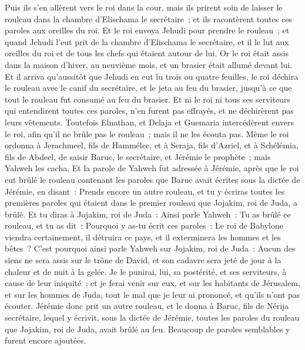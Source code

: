 \begin{multicols}{2}
Puis ils s'en allèrent vers le roi dans la cour, mais ils prirent soin de laisser le rouleau dans la chambre d'Elischama le secrétaire~; et ils racontèrent toutes ces paroles aux oreilles du roi.
Et le roi envoya Jehudi pour prendre le rouleau~; et quand Jehudi l'eut prit de la chambre d'Elischama le secrétaire, et il le lut aux oreilles du roi et de tous les chefs qui étaient autour de lui.
Or le roi était assis dans la maison d'hiver, au neuvième mois, et un brasier était allumé devant lui.
Et il arriva qu'aussitôt que Jehudi en eut lu trois ou quatre feuilles, le roi déchira le rouleau avec le canif du secrétaire, et le jeta au feu du brasier, jusqu'à ce que tout le rouleau fut consumé au feu du brasier.
Et ni le roi ni tous ses serviteurs qui entendirent toutes ces paroles, n'en furent pas effrayés, et ne déchirèrent pas leurs vêtements.
Toutefois Elnathan, et Delaja et Guemaria intercédèrent envers le roi, afin qu'il ne brûle pas le rouleau~; mais il ne les écouta pas.
Même le roi ordonna à Jerachmeel, fils de Hammélec, et à Seraja, fils d'Azriel, et à Schélémia, fils de Abdeel, de saisir Baruc, le secrétaire, et Jérémie le prophète~; mais Yahweh les cacha.
Et la parole de Yahweh fut adressée à Jérémie, après que le roi eut brûlé le rouleau contenant les paroles que Baruc avait écrites sous la dictée de Jérémie, en disant~:
Prends encore un autre rouleau, et tu y écriras toutes les premières paroles qui étaient dans le premier rouleau que Jojakim, roi de Juda, a brûlé.
Et tu diras à Jojakim, roi de Juda~: Ainsi parle Yahweh~: Tu as brûlé ce rouleau, et tu as dit~: Pourquoi y as-tu écrit ces paroles~: Le roi de Babylone viendra certainement, il détruira ce pays, et il exterminera les hommes et les bêtes~?
C'est pourquoi ainsi parle Yahweh sur Jojakim, roi de Juda~: Aucun des siens ne sera assis sur le trône de David, et son cadavre sera jeté de jour à la chaleur et de nuit à la gelée.
Je le punirai, lui, sa postérité, et ses serviteurs, à cause de leur iniquité~; et je ferai venir sur eux, et sur les habitants de Jérusalem, et sur les hommes de Juda, tout le mal que je leur ai prononcé, et qu'ils n'ont pas écouter.
Jérémie donc prit un autre rouleau, et le donna à Baruc, fils de Nérija secrétaire, lequel y écrivit, sous la dictée de Jérémie, toutes les paroles du rouleau que Jojakim, roi de Juda, avait brûlé au feu. Beaucoup de paroles semblables y furent encore ajoutées.

\end{multicols}
